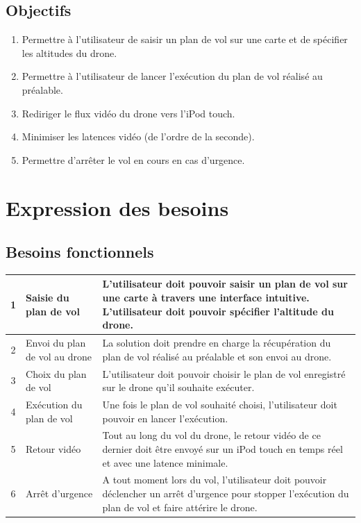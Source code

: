 \documentclass{article}
\begin{document}
	\subsection{Objectifs}
		\begin{enumerate}
        \item Permettre à l'utilisateur de saisir un plan de vol sur une carte et de spécifier les altitudes du drone.
		 \item Permettre à l'utilisateur de lancer l'exécution du plan de vol réalisé au préalable.
		 \item Rediriger le flux vidéo du drone vers l'iPod touch. 
		 \item Minimiser les latences vidéo (de l'ordre de la seconde).
		 \item Permettre d'arrêter le vol en cours en cas d'urgence.
		\end{enumerate}
\section{Expression des besoins}
	\subsection{Besoins fonctionnels}
	    \begin{center}
        \begin{tabularx}{15cm}{|c|p{4cm}|X|}
            \hline
            1 & Saisie du plan de vol & L'utilisateur doit pouvoir saisir un plan de vol sur une carte à travers une interface intuitive. L'utilisateur doit pouvoir spécifier l'altitude du drone.\\
            \hline
            2 & Envoi du plan de vol au drone & La solution doit prendre en charge la récupération du plan de vol réalisé au préalable et son envoi au drone. \\
            \hline
            3 & Choix du plan de vol  & L'utilisateur doit pouvoir choisir le plan de vol enregistré sur le drone qu'il souhaite exécuter. \\
            \hline
            4 & Exécution du plan de vol  & Une fois le plan de vol souhaité choisi, l'utilisateur doit pouvoir en lancer l'exécution. \\
            \hline
            5 & Retour vidéo  & Tout au long du vol du drone, le retour vidéo de ce dernier doit être envoyé sur un iPod touch en temps réel et avec une latence minimale. \\
            \hline
            6 & Arrêt d'urgence  & A tout moment lors du vol, l'utilisateur doit pouvoir déclencher un arrêt d'urgence pour stopper l'exécution du plan de vol et faire attérire le drone. \\
            \hline
        \end{tabularx}
        \end{center}
\end{document}
